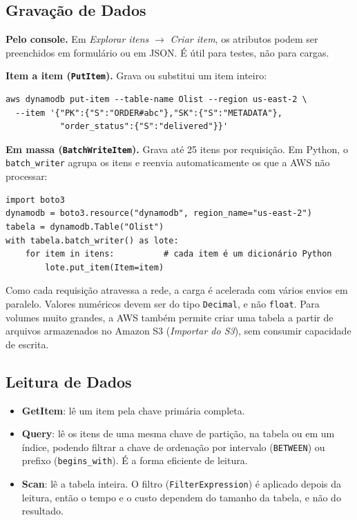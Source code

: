 \documentclass[12pt]{article}
\begin{document}
\subsection{Gravação de Dados}

\textbf{Pelo console.} Em \textit{Explorar itens} $\rightarrow$
\textit{Criar item}, os atributos podem ser preenchidos em formulário ou em
JSON. É útil para testes, não para cargas.

\textbf{Item a item (\texttt{PutItem}).} Grava ou substitui um item inteiro:

{\footnotesize
\begin{verbatim}
aws dynamodb put-item --table-name Olist --region us-east-2 \
  --item '{"PK":{"S":"ORDER#abc"},"SK":{"S":"METADATA"},
           "order_status":{"S":"delivered"}}'
\end{verbatim}
}

\textbf{Em massa (\texttt{BatchWriteItem}).} Grava até 25 itens por
requisição. Em Python, o \texttt{batch\_writer} agrupa os itens e reenvia
automaticamente os que a AWS não processar:

{\footnotesize
\begin{verbatim}
import boto3
dynamodb = boto3.resource("dynamodb", region_name="us-east-2")
tabela = dynamodb.Table("Olist")
with tabela.batch_writer() as lote:
    for item in itens:          # cada item é um dicionário Python
        lote.put_item(Item=item)
\end{verbatim}
}

Como cada requisição atravessa a rede, a carga é acelerada com vários envios
em paralelo. Valores numéricos devem ser do tipo \texttt{Decimal}, e não
\texttt{float}. Para volumes muito grandes, a AWS também permite criar uma
tabela a partir de arquivos armazenados no Amazon S3 (\textit{Importar do
S3}), sem consumir capacidade de escrita.

\subsection{Leitura de Dados}

\begin{itemize}
  \item \textbf{GetItem}: lê um item pela chave primária completa.
  \item \textbf{Query}: lê os itens de uma mesma chave de partição, na tabela
  ou em um índice, podendo filtrar a chave de ordenação por intervalo
  (\texttt{BETWEEN}) ou prefixo (\texttt{begins\_with}). É a forma eficiente
  de leitura.
  \item \textbf{Scan}: lê a tabela inteira. O filtro
  (\texttt{FilterExpression}) é aplicado depois da leitura, então o tempo e o
  custo dependem do tamanho da tabela, e não do resultado.
\end{itemize}
\end{document}
